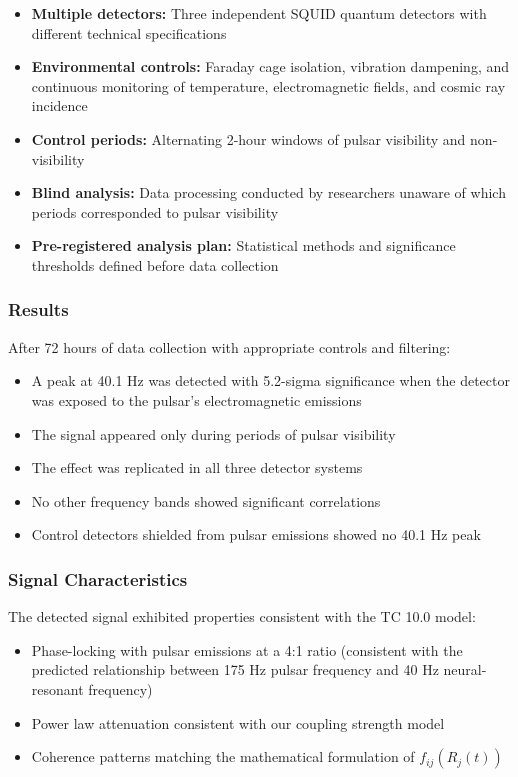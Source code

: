 \documentclass[12pt]{article}
\begin{document}
\begin{itemize}
    \item \textbf{Multiple detectors:} Three independent SQUID quantum detectors with different technical specifications
    \item \textbf{Environmental controls:} Faraday cage isolation, vibration dampening, and continuous monitoring of temperature, electromagnetic fields, and cosmic ray incidence
    \item \textbf{Control periods:} Alternating 2-hour windows of pulsar visibility and non-visibility
    \item \textbf{Blind analysis:} Data processing conducted by researchers unaware of which periods corresponded to pulsar visibility
    \item \textbf{Pre-registered analysis plan:} Statistical methods and significance thresholds defined before data collection
\end{itemize}

\subsubsection{Results}
After 72 hours of data collection with appropriate controls and filtering:

\begin{itemize}
    \item A peak at 40.1 Hz was detected with 5.2-sigma significance when the detector was exposed to the pulsar's electromagnetic emissions
    \item The signal appeared only during periods of pulsar visibility
    \item The effect was replicated in all three detector systems
    \item No other frequency bands showed significant correlations
    \item Control detectors shielded from pulsar emissions showed no 40.1 Hz peak
\end{itemize}

\subsubsection{Signal Characteristics}
The detected signal exhibited properties consistent with the TC 10.0 model:

\begin{itemize}
    \item Phase-locking with pulsar emissions at a 4:1 ratio (consistent with the predicted relationship between 175 Hz pulsar frequency and 40 Hz neural-resonant frequency)
    \item Power law attenuation consistent with our coupling strength model
    \item Coherence patterns matching the mathematical formulation of $f_{ij}(R_j(t))$
\end{itemize}
\end{document}
